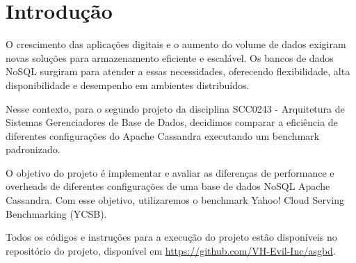 \section{Introdução}

O crescimento das aplicações digitais e o aumento do volume de dados exigiram novas soluções para armazenamento eficiente e escalável.
Os bancos de dados NoSQL surgiram para atender a essas necessidades, oferecendo flexibilidade, alta disponibilidade e desempenho em ambientes distribuídos.

Nesse contexto, para o segundo projeto da disciplina SCC0243 - Arquitetura de Sistemas Gerenciadores de Base de Dados,
decidimos comparar a eficiência de diferentes configurações do Apache Cassandra executando um benchmark padronizado.

O objetivo do projeto é implementar e avaliar as diferenças de performance e overheads de diferentes configurações de uma base de dados
NoSQL Apache Cassandra. Com esse objetivo, utilizaremos o benchmark Yahoo! Cloud Serving Benchmarking (YCSB). 

Todos os códigos e instruções para a execução do projeto estão disponíveis no repositório do projeto,
disponível em \url{https://github.com/VH-Evil-Inc/asgbd}.
